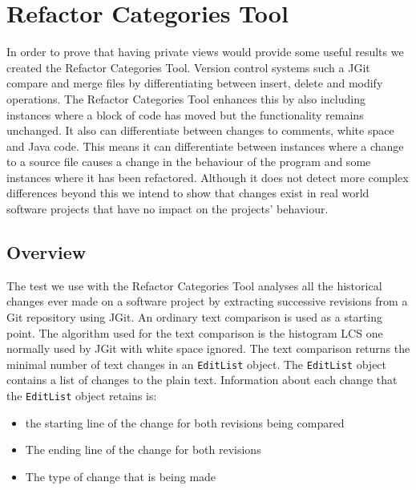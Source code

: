 
\chapter{Refactor Categories Tool}
In order to prove that having private views would provide some useful results we created the Refactor Categories Tool. Version control systems such a JGit compare and merge files by differentiating between insert, delete and modify operations. The Refactor Categories Tool enhances this by also including instances where a block of code has moved but the functionality remains unchanged. It also can differentiate between changes to comments, white space and Java code. This means it can differentiate between instances where a change to a source file causes a change in the behaviour of the program and some instances where it has been refactored.  Although it does not detect more complex differences beyond this we intend to show that changes exist in real world software projects that have no impact on the projects' behaviour.



\section{Overview}
The test we use with the Refactor Categories Tool analyses all the historical changes ever made on a software project by extracting successive revisions from a Git repository using JGit.
An ordinary text comparison is used as a starting point.  The algorithm used for the text comparison is the histogram LCS one normally used by JGit with white space ignored. The text comparison returns the minimal number of text changes in an \lstinline{EditList} object. The \lstinline{EditList} object contains a list of changes to the plain text. Information about each change that the \lstinline{EditList} object retains is:

\begin{itemize}
  \item the starting line of the change for both revisions being compared
  \item The ending line of the change for both revisions 
  \item The type of change that is being made
\end{itemize}

